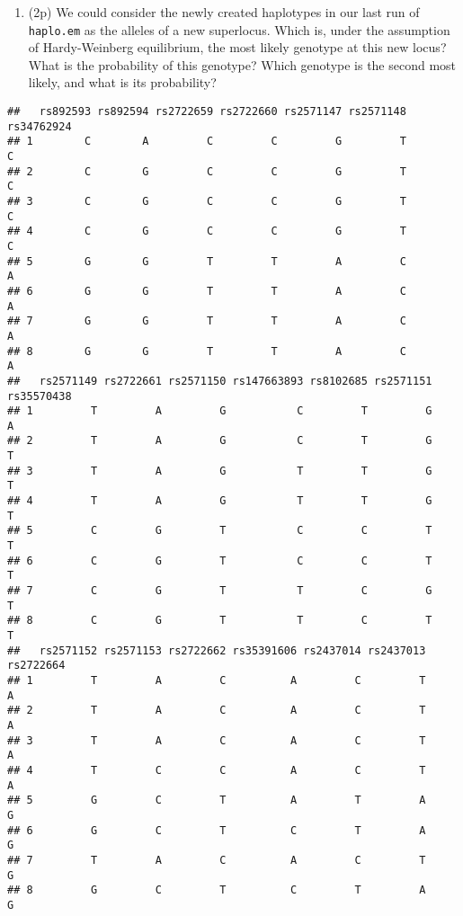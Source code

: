 \documentclass[
]{article}
\newenvironment{Shaded}{\begin{snugshade}}{\end{snugshade}}
\newcommand{\NormalTok}[1]{#1}
\newcommand{\OperatorTok}[1]{\textcolor[rgb]{0.81,0.36,0.00}{\textbf{#1}}}
\newcommand{\StringTok}[1]{\textcolor[rgb]{0.31,0.60,0.02}{#1}}
\providecommand{\tightlist}{%
  \setlength{\itemsep}{0pt}\setlength{\parskip}{0pt}}
\begin{document}
\begin{enumerate}
\def\labelenumi{\arabic{enumi}.}
\setcounter{enumi}{7}
\tightlist
\item
  (2p) We could consider the newly created haplotypes in our last run of
  \texttt{haplo.em} as the alleles of a new superlocus. Which is, under
  the assumption of Hardy-Weinberg equilibrium, the most likely genotype
  at this new locus? What is the probability of this genotype? Which
  genotype is the second most likely, and what is its probability?
\end{enumerate}

\begin{Shaded}
\end{Shaded}

\begin{verbatim}
##   rs892593 rs892594 rs2722659 rs2722660 rs2571147 rs2571148 rs34762924
## 1        C        A         C         C         G         T          C
## 2        C        G         C         C         G         T          C
## 3        C        G         C         C         G         T          C
## 4        C        G         C         C         G         T          C
## 5        G        G         T         T         A         C          A
## 6        G        G         T         T         A         C          A
## 7        G        G         T         T         A         C          A
## 8        G        G         T         T         A         C          A
##   rs2571149 rs2722661 rs2571150 rs147663893 rs8102685 rs2571151 rs35570438
## 1         T         A         G           C         T         G          A
## 2         T         A         G           C         T         G          T
## 3         T         A         G           T         T         G          T
## 4         T         A         G           T         T         G          T
## 5         C         G         T           C         C         T          T
## 6         C         G         T           C         C         T          T
## 7         C         G         T           T         C         G          T
## 8         C         G         T           T         C         T          T
##   rs2571152 rs2571153 rs2722662 rs35391606 rs2437014 rs2437013 rs2722664
## 1         T         A         C          A         C         T         A
## 2         T         A         C          A         C         T         A
## 3         T         A         C          A         C         T         A
## 4         T         C         C          A         C         T         A
## 5         G         C         T          A         T         A         G
## 6         G         C         T          C         T         A         G
## 7         T         A         C          A         C         T         G
## 8         G         C         T          C         T         A         G
\end{verbatim}
\end{document}
